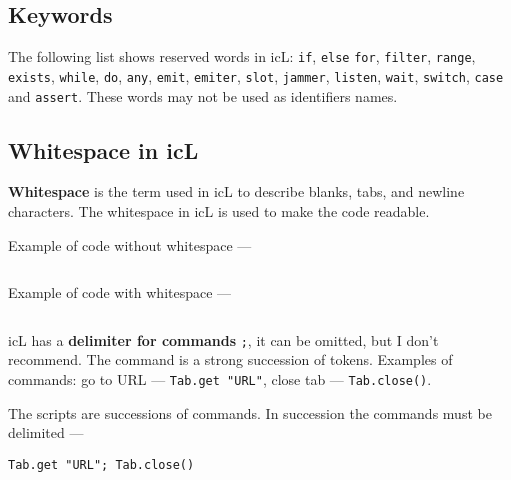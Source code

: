 \subsection{Keywords}

The following list shows reserved words in icL: \texttt{if}, \texttt{else} \texttt{for}, \texttt{filter}, \texttt{range}, \texttt{exists}, \texttt{while}, \texttt{do}, \texttt{any}, \texttt{emit}, \texttt{emiter}, \texttt{slot}, \texttt{jammer}, \texttt{listen}, \texttt{wait}, \texttt{switch}, \texttt{case} and \texttt{assert}. These words may not be used as identifiers names.

\subsection{Whitespace in icL}

\textbf{Whitespace} is the term used in icL to describe blanks, tabs, and newline characters. The whitespace in icL is used to make the code readable.

Example of code without whitespace —

\inputminted[linenos]{icl}{../sources/unreadable.icL}

Example of code with whitespace —

\inputminted[linenos]{icl}{../sources/readable.icL}

icL has a \textbf{delimiter for commands} \texttt{;}, it can be omitted, but I don't recommend. The command is a  strong succession of tokens. Examples of commands: go to URL — \texttt{Tab.get "URL"}, close tab — \texttt{Tab.close()}.

The scripts are successions of commands. In succession the commands must be delimited —
\begin{verbatim}
Tab.get "URL"; Tab.close()
\end{verbatim}
